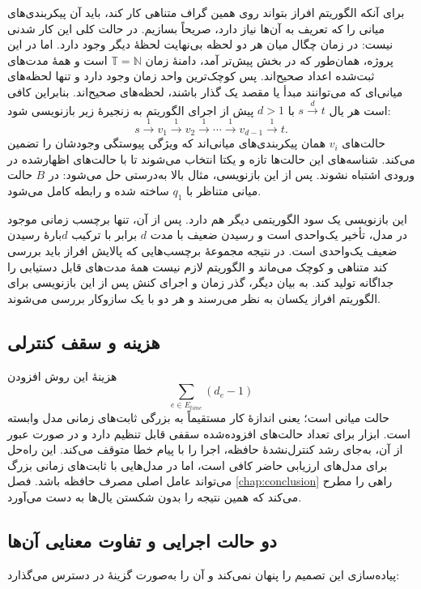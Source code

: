 برای آنکه الگوریتم افراز بتواند روی همین گراف متناهی کار کند، باید آن پیکربندی‌های میانی را که تعریف به آن‌ها نیاز دارد، صریحاً بسازیم. در حالت کلی این کار شدنی نیست: در زمان چگال میان هر دو لحظه بی‌نهایت لحظهٔ دیگر وجود دارد. اما در این پروژه، همان‌طور که در بخش پیش‌تر آمد، دامنهٔ زمان $\mathbb{T}=\mathbb{N}$ است و همهٔ مدت‌های ثبت‌شده اعداد صحیح‌اند. پس کوچک‌ترین واحد زمان وجود دارد و تنها لحظه‌های میانی‌ای که می‌توانند مبدأ یا مقصد یک گذار باشند، لحظه‌های صحیح‌اند. بنابراین کافی است هر یال $s\xrightarrow{d}t$ با $d>1$ پیش از اجرای الگوریتم به زنجیرهٔ زیر بازنویسی شود:
\[
s\xrightarrow{1}v_1\xrightarrow{1}v_2\xrightarrow{1}\cdots
\xrightarrow{1}v_{d-1}\xrightarrow{1}t.
\]
حالت‌های $v_i$ همان پیکربندی‌های میانی‌اند که ویژگی پیوستگی وجودشان را تضمین می‌کند. شناسه‌های این حالت‌ها تازه و یکتا انتخاب می‌شوند تا با حالت‌های اظهارشده در ورودی اشتباه نشوند. پس از این بازنویسی، مثال بالا به‌درستی حل می‌شود: در $B$ حالت میانی متناظر با $q_1$ ساخته شده و رابطه کامل می‌شود.

این بازنویسی یک سود الگوریتمی دیگر هم دارد. پس از آن، تنها برچسب زمانی موجود در مدل، تأخیر یک‌واحدی است و رسیدن ضعیف با مدت $d$ برابر با ترکیب $d$بارهٔ رسیدن ضعیف یک‌واحدی است. در نتیجه مجموعهٔ برچسب‌هایی که پالایش افراز باید بررسی کند متناهی و کوچک می‌ماند و الگوریتم لازم نیست همهٔ مدت‌های قابل دستیابی را جداگانه تولید کند. به بیان دیگر، گذر زمان و اجرای کنش پس از این بازنویسی برای الگوریتم افراز یکسان به نظر می‌رسند و هر دو با یک سازوکار بررسی می‌شوند.

\subsection{هزینه و سقف کنترلی}

هزینهٔ این روش افزودن
\[
\sum_{e\in E_{time}}(d_e-1)
\]
حالت میانی است؛ یعنی اندازهٔ کار مستقیماً به بزرگی ثابت‌های زمانی مدل وابسته است. ابزار برای تعداد حالت‌های افزوده‌شده سقفی قابل تنظیم دارد و در صورت عبور از آن، به‌جای رشد کنترل‌نشدهٔ حافظه، اجرا را با پیام خطا متوقف می‌کند. این راه‌حل برای مدل‌های ارزیابی حاضر کافی است، اما در مدل‌هایی با ثابت‌های زمانی بزرگ می‌تواند عامل اصلی مصرف حافظه باشد. فصل \ref{chap:conclusion} راهی را مطرح می‌کند که همین نتیجه را بدون شکستن یال‌ها به دست می‌آورد.

\subsection{دو حالت اجرایی و تفاوت معنایی آن‌ها}

پیاده‌سازی این تصمیم را پنهان نمی‌کند و آن را به‌صورت گزینهٔ  در دسترس می‌گذارد:

